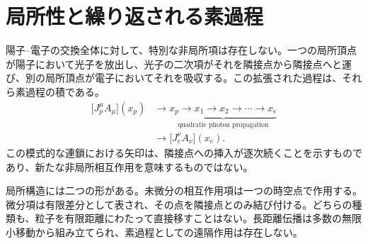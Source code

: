 \section{局所性と繰り返される素過程}

陽子--電子の交換全体に対して、特別な非局所項は存在しない。一つの局所頂点が陽子において光子を放出し、光子の二次項がそれを隣接点から隣接点へと運び、別の局所頂点が電子においてそれを吸収する。この拡張された過程は、それら素過程の積である。
\begin{equation}
\begin{aligned}
\bigl[J_p^\mu A_\mu\bigr](x_p)
&\longrightarrow
\underbrace{x_p\to x_1\to x_2\to\cdots\to x_e}_{\text{quadratic photon propagation}}
\\
&\longrightarrow
\bigl[J_e^\nu A_\nu\bigr](x_e).
\end{aligned}
\end{equation}
この模式的な連鎖における矢印は、隣接点への挿入が逐次続くことを示すものであり、新たな非局所相互作用を意味するものではない。

\begin{classroomqa}
\end{classroomqa}

局所構造には二つの形がある。未微分の相互作用項は一つの時空点で作用する。微分項は有限差分として表され、その点を隣接点とのみ結び付ける。どちらの種類も、粒子を有限距離にわたって直接移すことはない。長距離伝播は多数の無限小移動から組み立てられ、素過程としての遠隔作用は存在しない。

\begin{classroomqa}
\end{classroomqa}

\begin{classroomqa}
\end{classroomqa}

